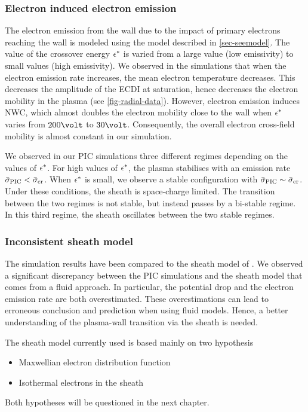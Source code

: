   
  \subsubsection*{Electron induced electron emission}
  
  The electron  emission from the wall due to the impact of primary electrons reaching the wall is modeled using the model described in \cref{sec-seemodel}.
  The value of the crossover energy $\epsilon^{*}$ is varied from a large value (low emissivity) to small values (high emissivity).
  We observed in the simulations that when the electron emission rate increases, the mean electron temperature decreases.
  This decreases the amplitude of the \ac{ECDI} at saturation, hence decreases the electron mobility in the plasma (see \cref{fig-radial-data}).
  However, electron emission induces \ac{NWC}, which almost doubles the electron mobility close to the wall when $\epsilon^{*}$ varies from $200\volt$ to $30\volt$.
  Consequently, the overall electron cross-field mobility is almost constant in our simulation.
  
  We observed in our \ac{PIC} simulations three different regimes depending on the values of $\epsilon^{*}$.
  For high values of $\epsilon^{*}$, the plasma stabilises with an emission rate $ \bar{\sigma }_{\rm PIC} <  \bar{\sigma }_{\rm cr}$.
  When $\epsilon^{*}$ is small, we observe a stable configuration with $ \bar{\sigma }_{\rm PIC} \sim  \bar{\sigma }_{\rm cr}$.
  Under these conditions, the sheath is space-charge limited.
  The transition between the two regimes is not stable, but instead passes by a bi-stable regime.
  In this third regime, the sheath oscillates between the two stable regimes.
  

  \subsubsection*{Inconsistent sheath model }
  
  The simulation results have been compared to the sheath model of \citet{hobbs1967}.
  We observed a significant discrepancy between the \ac{PIC} simulations and the sheath model that comes from a fluid approach.
  In particular, the potential drop and the electron emission rate are both overestimated.
  These overestimations can lead to erroneous conclusion and prediction when using fluid models.
  Hence, a better understanding of the plasma-wall transition via the sheath is needed.
  
  The sheath model currently used is based mainly on two hypothesis
  \begin{itemize}
    \item Maxwellian electron distribution function
    \item Isothermal electrons in the sheath
  \end{itemize}
  
  Both hypotheses will be questioned in the next chapter.
  
